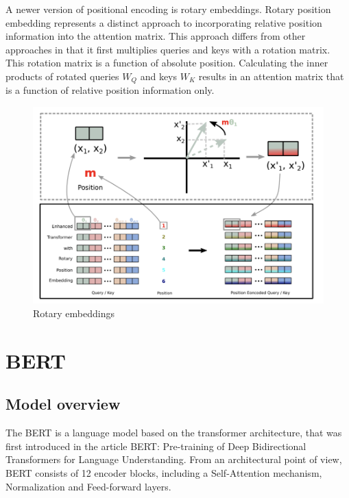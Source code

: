 \documentclass[PMI,VKR]{HSEUniversity}
\begin{document}
A newer version of positional encoding is rotary embeddings.
Rotary position embedding represents a distinct approach to incorporating relative position information into the attention matrix. 
This approach differs from other approaches in that it first multiplies queries and keys with a rotation matrix. This rotation matrix is a function of absolute position. 
Calculating the inner products of rotated queries $W_Q$ and keys $W_K$ results in an attention matrix that is a function of relative position information only.

\begin{figure}[h]
    \centering
    \includegraphics[scale=0.7]{img/rotary_embs.png}
    \caption{Rotary embeddings}
\end{figure}

\section{BERT}
\subsection{Model overview}

The BERT is a language model based on the transformer architecture, that was first introduced in the article BERT: Pre-training of Deep Bidirectional Transformers for Language Understanding\cite{bert:2018}.  
From an architectural point of view, BERT consists of 12 encoder blocks, including a Self-Attention mechanism, Normalization and Feed-forward layers.
\end{document}
